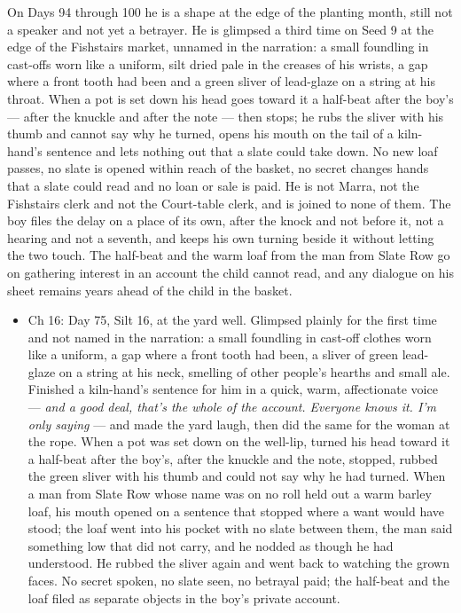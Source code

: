 \documentclass{design/chronicle}
\begin{document}
{On Days 94 through 100 he is a shape at the edge of the planting month, still not a speaker and not yet a betrayer. He is glimpsed a third time on Seed 9 at the edge of the Fishstairs market, unnamed in the narration: a small foundling in cast-offs worn like a uniform, silt dried pale in the creases of his wrists, a gap where a front tooth had been and a green sliver of lead-glaze on a string at his throat. When a pot is set down his head goes toward it a half-beat after the boy’s --- after the knuckle and after the note --- then stops; he rubs the sliver with his thumb and cannot say why he turned, opens his mouth on the tail of a kiln-hand’s sentence and lets nothing out that a slate could take down. No new loaf passes, no slate is opened within reach of the basket, no secret changes hands that a slate could read and no loan or sale is paid. He is not Marra, not the Fishstairs clerk and not the Court-table clerk, and is joined to none of them. The boy files the delay on a place of its own, after the knock and not before it, not a hearing and not a seventh, and keeps his own turning beside it without letting the two touch. The half-beat and the warm loaf from the man from Slate Row go on gathering interest in an account the child cannot read, and any dialogue on his sheet remains years ahead of the child in the basket.

\begin{itemize}[leftmargin=1.4em,itemsep=1pt,topsep=3pt,parsep=0pt]

\item Ch 16: Day 75, Silt 16, at the yard well. Glimpsed plainly for the first time and not named in the narration: a small foundling in cast-off clothes worn like a uniform, a gap where a front tooth had been, a sliver of green lead-glaze on a string at his neck, smelling of other people’s hearths and small ale. Finished a kiln-hand’s sentence for him in a quick, warm, affectionate voice --- \emph{and a good deal, that’s the whole of the account. Everyone knows it. I’m only saying} --- and made the yard laugh, then did the same for the woman at the rope. When a pot was set down on the well-lip, turned his head toward it a half-beat after the boy’s, after the knuckle and the note, stopped, rubbed the green sliver with his thumb and could not say why he had turned. When a man from Slate Row whose name was on no roll held out a warm barley loaf, his mouth opened on a sentence that stopped where a want would have stood; the loaf went into his pocket with no slate between them, the man said something low that did not carry, and he nodded as though he had understood. He rubbed the sliver again and went back to watching the grown faces. No secret spoken, no slate seen, no betrayal paid; the half-beat and the loaf filed as separate objects in the boy’s private account.


\end{itemize}}
\end{document}
